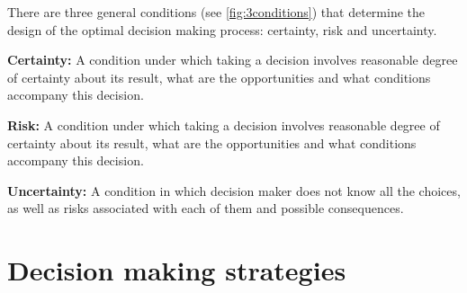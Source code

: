\documentclass[
  12pt,
  oneside]{book}
\theoremstyle{definition}
\theoremstyle{definition}
\theoremstyle{definition}
\theoremstyle{definition}
\theoremstyle{remark}
\begin{document}
There are three general conditions (see \ref{fig:3conditions}) that determine the design of the optimal decision making process: certainty, risk and uncertainty.

\textbf{Certainty:}
A condition under which taking a decision involves reasonable degree of certainty about its result, what are the opportunities and what conditions accompany this decision.

\textbf{Risk:}
A condition under which taking a decision involves reasonable degree of certainty about its result, what are the opportunities and what conditions accompany this decision.

\textbf{Uncertainty:}
A condition in which decision maker does not know all the choices, as well as risks associated with each of them and possible consequences.

\hypertarget{decision-making-strategies}{%
\section{Decision making strategies}\label{decision-making-strategies}}
\end{document}
